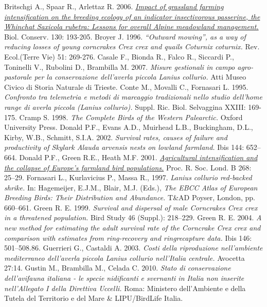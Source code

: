 \documentclass[10pt,twoside,openany,x11names,svgnames,italian,a5paper,dvipsnames,table]{memoir}
\begin{document}
\begin{thebibliography}{9}
Britschgi A., Spaar R., Arlettaz R. 2006. \href{http://www.ecolevol.unibe.ch/content/e6671/e6673/e6861/BritschgiSpaar.pdf}{\emph{Impact of grassland farming intensification on the breeding ecology of an indicator insectivorous passerine, the Whinchat \emph{Saxicola rubetra}: Lessons for overall Alpine meadowland management.}} Biol. Conserv. 130: 193-205.
Broyer J. 1996. \emph{“Outward mowing”, as a way of reducing losses of young corncrakes \emph{Crex crex} and quails \emph{Coturnix coturnix}.} Rev. Ecol.(Terre Vie) 51: 269-276.
Casale F., Bionda R., Falco R., Siccardi P., Toninelli V., Rubolini D., Brambilla M. 2007. \emph{Misure gestionali in campo agro-pastorale per la conservazione dell’averla piccola \emph{Lanius collurio}.} Atti Museo Civico di Storia Naturale di Trieste.
Conte M., Movalli C., Fornasari L. 1995. \emph{Confronto tra telemetria e metodi di marcaggio tradizionali nello studio dell’home range di averla piccola (\emph{Lanius collurio}).} Suppl. Ric. Biol. Selvaggina XXIII: 169-175.
Cramp S. 1998. \emph{The Complete Birds of the Western Palearctic.} Oxford University Press.
Donald P.F., Evans A.D., Muirhead L.B., Buckingham, D.L., Kirby, W.B., Schmitt, S.I.A. 2002. \emph{Survival rates, causes of failure and productivity of Skylark \emph{Alauda arvensis} nests on lowland farmland.} Ibis 144: 652–664.
Donald P.F., Green R.E., Heath M.F. 2001. \href{http://www.ncbi.nlm.nih.gov/pmc/articles/PMC1087596/pdf/PB010025.pdf}{\emph{Agricultural intensification and the collapse of Europe’s farmland bird populations.}} Proc. R. Soc. Lond. B 268: 25–29.
Fornasari L., Kurlavicius P., Massa R., 1997. \emph{\emph{Lanius collurio} red-backed shrike.} In: Hagemeijer, E.J.M., Blair, M.J. (Eds.), \emph{The EBCC Atlas of European Breeding Birds: Their Distribution and Abundance.} T\&AD Poyser, London, pp. 660–661.
Green R. E. 1999. \emph{Survival and dispersal of male Corncrakes \emph{Crex crex} in a threatened population.} Bird Study 46 (Suppl.): 218–229.
Green R. E. 2004. \emph{A new method for estimating the adult survival rate of the Corncrake \emph{Crex crex} and comparison with estimates from ring-recovery and ringrecapture data.} Ibis 146: 501–508.86.
Guerrieri G., Castaldi A. 2003. \emph{Costi della riproduzione nell'ambiente mediterraneo dell’averla piccola \emph{Lanius collurio} nell’Italia centrale.} Avocetta 27:14.
Gustin M., Brambilla M., Celada C. 2010. \emph{Stato di conservazione dell’avifauna italiana - le specie nidificanti e svernanti in Italia non inserite nell’Allegato I della Direttiva Uccelli.} Roma: Ministero dell’Ambiente e della Tutela del Territorio e del Mare \& LIPU/BirdLife Italia.

\end{thebibliography}
\end{document}
